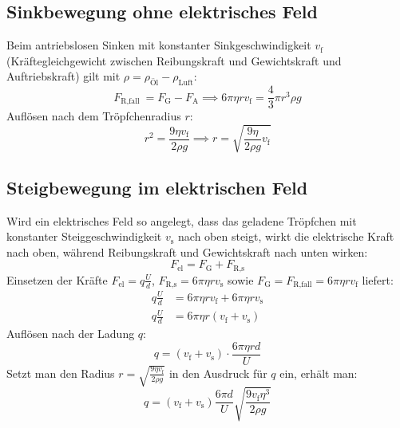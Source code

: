 \documentclass[12pt,a4paper,titlepage]{scrartcl}
\numberwithin{equation}{section}
\numberwithin{table}{section}
\numberwithin{figure}{section}
\begin{document}
\subsection{Sinkbewegung ohne elektrisches Feld}
Beim antriebslosen Sinken mit konstanter Sinkgeschwindigkeit $v_{\text{f}}$ 
(Kräftegleichgewicht zwischen Reibungskraft und Gewichtskraft und Auftriebskraft) gilt mit 
$\rho = \rho_{\text{Öl}} - \rho_{\text{Luft}}$:
\begin{equation}
    F_{\text{R,fall }} = F_{\text{G}} - F_{\text{A}} \implies 6\pi\eta r v_{\text{f}} = \frac{4}{3}\pi r^3 \rho g
\end{equation}
Auflösen nach dem Tröpfchenradius $r$:
\begin{equation}
    r^2 = \frac{9\eta v_{\text{f}}}{2\rho g} \implies r = \sqrt{\frac{9\eta}{2\rho g}v_{\text{f}}} \label{radius}
\end{equation}

\noindent
\subsection{Steigbewegung im elektrischen Feld}

Wird ein elektrisches Feld so angelegt, dass das geladene Tröpfchen mit konstanter Steiggeschwindigkeit $v_{\text{s}}$ nach oben steigt, wirkt die elektrische Kraft nach oben, während Reibungskraft und Gewichtskraft nach unten wirken:
\begin{equation}
    F_{\text{el}} = F_{\text{G}} + F_{\text{R,s}}
\end{equation}
Einsetzen der Kräfte $F_{\text{el}} = q \frac{U}{d}$, $F_{\text{R,s}} = 6\pi\eta r v_{\text{s}}$ sowie $F_{\text{G}} = F_{\text{R,fall}} = 6\pi\eta r v_{\text{f}}$ liefert:
\begin{align}
    q \frac{U}{d} &= 6\pi\eta r v_{\text{f}} + 6\pi\eta r v_{\text{s}} \\
    q \frac{U}{d} &= 6\pi\eta r (v_{\text{f}} + v_{\text{s}})
\end{align}
Auflösen nach der Ladung $q$:
\begin{equation}
    q = (v_{\text{f}} + v_{\text{s}}) \cdot \frac{6\pi\eta r d}{U}
\end{equation}
Setzt man den Radius $r = \sqrt{\frac{9\eta v_{\text{f}}}{2\rho g}}$ in den Ausdruck für $q$ ein, erhält man:
\begin{equation}
    q = (v_{\text{f}} + v_{\text{s}}) \frac{6\pi d}{U} \sqrt{\frac{9 v_{\text{f}} \eta^3}{2\rho g}} \label{Ladung}
\end{equation}
\end{document}
